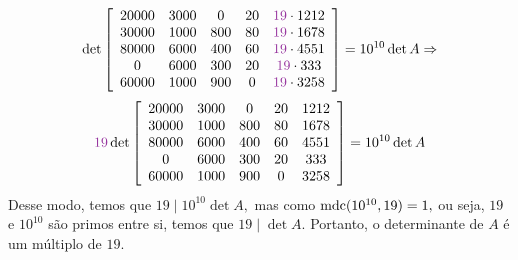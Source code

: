 \documentclass[11pt,a4paper]{article}
\begin{document}
{\[\]
\[\det \left[ \begin{array}{ccccc} 20000 & 3000 &0  & 20 & \textcolor{Purple}{19} \cdot 1212 \\ 30000 & 1000 & 800 & 80 & \textcolor{Purple}{19} \cdot 1678 \\ 80000 & 6000 & 400 & 60 & \textcolor{Purple}{19} \cdot 4551 \\ 0 & 6000 & 300 & 20 & \textcolor{Purple}{19} \cdot 333 \\ 60000 & 1000 & 900 & 0 & \textcolor{Purple}{19} \cdot 3258 \end{array} \right] = 10^{10} \det A \Rightarrow
\]
\[\textcolor{Purple}{19} \det \left[ \begin{array}{ccccc} 20000 & 3000 &0  & 20 & 1212 \\ 30000 & 1000 & 800 & 80 & 1678 \\ 80000 & 6000 & 400 & 60 & 4551 \\ 0 & 6000 & 300 & 20 & 333 \\ 60000 & 1000 & 900 & 0 & 3258 \end{array} \right] = 10^{10} \det A 
\]
Desse modo, temos que $19 \mid 10^{10} \det A,$ mas como ${\rm mdc}(10^{10}, 19) = 1,$ ou seja, $19$ e $10^{10}$ são primos entre si, temos que $19 \mid \det A.$ Portanto, o determinante de $A$ é um múltiplo de $19.$
}
\end{document}
